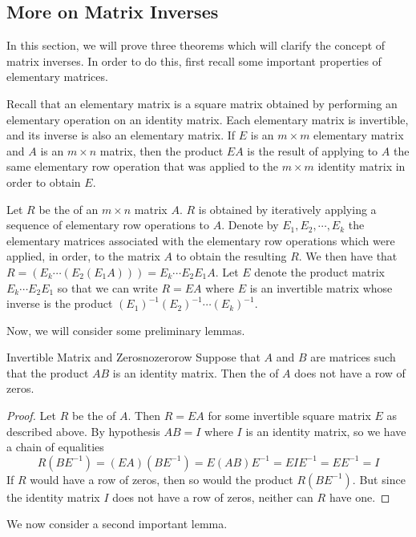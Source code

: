 \subsection{More on Matrix Inverses}

In this section, we will prove three theorems which will clarify the concept of matrix inverses. In order to do this, first recall some important properties of elementary matrices. 

Recall that an elementary matrix is a square matrix obtained by performing an elementary operation on an identity matrix. Each elementary matrix is invertible, and its inverse is also an elementary matrix. If $E$ is an $m \times m$ elementary matrix and $A$ is an $m \times n$ matrix, then the product $EA$ is the result of applying to $A$ the same elementary row operation that was applied to the $m \times m$ identity matrix in order to obtain $E$.

Let $R$ be the \rref \;of an $m \times n$ matrix $A$. $R$ is obtained by iteratively applying a sequence of elementary row operations to $A$. Denote by $E_1, E_2, \cdots, E_k$ the elementary matrices associated with the elementary row operations which were applied, in order, to the matrix $A$ to obtain the resulting $R$. We then have that $R = \left( E_k \cdots \left( E_2 \left( E_1A \right) \right)\right) = E_k \cdots E_2E_1A$. Let $E$ denote the product matrix $E_k \cdots E_2E_1$ so that we can write $R=EA$ where $E$ is an invertible matrix whose inverse is the product $(E_1)^{-1}(E_2)^{-1} \cdots (E_k)^{-1}$.

Now, we will consider some preliminary lemmas. 

\begin{lemma}{Invertible Matrix and Zeros}{nozerorow}
Suppose that $A$ and $B$ are matrices such that the product $AB$ is an identity matrix. Then the \rref \;of $A$ does not have a row of zeros.
\end{lemma}
\ifdefined\showproofs
\begin{proof}
Let $R$ be the \rref \;of $A$. Then $R=EA$ for some invertible square matrix $E$ as described above. By hypothesis $AB=I$ where $I$ is an identity matrix, so we have a chain of equalities
\begin{equation*}
R(BE^{-1})
=
(EA)(BE^{-1})
=
E(AB)E^{-1}
=
EIE^{-1}
=
EE^{-1}
=
I
\end{equation*}
If $R$ would have a row of zeros, then so would the product $R(BE^{-1})$. But since the identity matrix $I$ does not have a row of zeros, neither can $R$ have one.
\end{proof}
\fi
We now consider a second important lemma.

